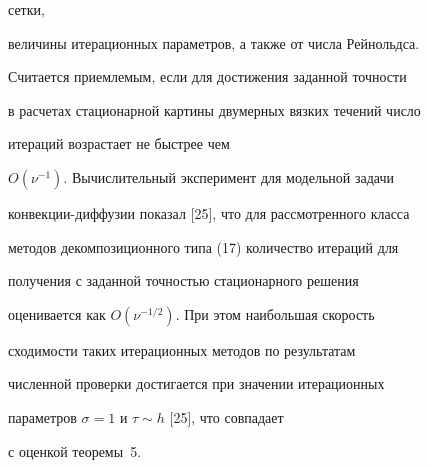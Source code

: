 сетки,


величины итерационных параметров, а также от числа Рейнольдса.


Считается приемлемым, если для достижения заданной точности


в расчетах стационарной картины двумерных вязких течений число


итераций возрастает не быстрее чем


$O(\nu^{-1})$. Вычислительный эксперимент для модельной задачи


конвекции-диффузии показал [25], что для рассмотренного класса


методов декомпозиционного типа (17) количество итераций для


получения с заданной точностью стационарного решения


оценивается как $O(\nu^{-1/2})$. При этом наибольшая скорость


сходимости таких итерационных методов по результатам


численной проверки достигается при значении итерационных


параметров $\sigma=1$ и $\tau\sim h$ [25], что совпадает


с оценкой теоремы~5.





